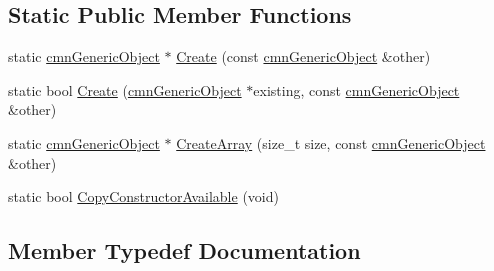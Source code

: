 \subsection*{Static Public Member Functions}
\begin{DoxyCompactItemize}
\item 
static \hyperlink{classcmn_generic_object}{cmn\+Generic\+Object} $\ast$ \hyperlink{classcmn_conditional_object_factory_copy_3_01true_00_01mts_generic_object_proxy_3_01__element_type_01_4_01_4_a7e210cb7361d95eb1a34c97960e260f6}{Create} (const \hyperlink{classcmn_generic_object}{cmn\+Generic\+Object} \&other)
\item 
static bool \hyperlink{classcmn_conditional_object_factory_copy_3_01true_00_01mts_generic_object_proxy_3_01__element_type_01_4_01_4_ac0df6ce8746ed47ad7cd37d5a4e576a3}{Create} (\hyperlink{classcmn_generic_object}{cmn\+Generic\+Object} $\ast$existing, const \hyperlink{classcmn_generic_object}{cmn\+Generic\+Object} \&other)
\item 
static \hyperlink{classcmn_generic_object}{cmn\+Generic\+Object} $\ast$ \hyperlink{classcmn_conditional_object_factory_copy_3_01true_00_01mts_generic_object_proxy_3_01__element_type_01_4_01_4_aad78eeb6ae10afc87109b2addc249a62}{Create\+Array} (size\+\_\+t size, const \hyperlink{classcmn_generic_object}{cmn\+Generic\+Object} \&other)
\item 
static bool \hyperlink{classcmn_conditional_object_factory_copy_3_01true_00_01mts_generic_object_proxy_3_01__element_type_01_4_01_4_a5afbf22adee42cc8dd0b6fd836b31fd5}{Copy\+Constructor\+Available} (void)
\end{DoxyCompactItemize}


\subsection{Member Typedef Documentation}
\hypertarget{classcmn_conditional_object_factory_copy_3_01true_00_01mts_generic_object_proxy_3_01__element_type_01_4_01_4_a00518536863dfeebbba5ece74e4b2303}{}
